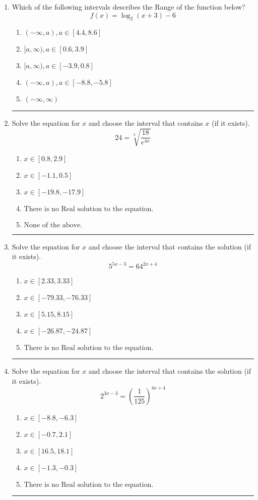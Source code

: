 \documentclass[14pt]{extbook}
\newcommand{\litem}[1]{\item#1\hspace*{-1cm}\rule{\textwidth}{0.4pt}}
\begin{document}
\begin{enumerate}
{\begin{enumerate}[label=\Alph*.]
\end{enumerate} }
\litem{
Which of the following intervals describes the Range of the function below?\[ f(x) = \log_2{(x+3)}-6 \]\begin{enumerate}[label=\Alph*.]
\item \( (-\infty, a), a \in [4.4, 8.6] \)
\item \( [a, \infty), a \in [0.6, 3.9] \)
\item \( [a, \infty), a \in [-3.9, 0.8] \)
\item \( (-\infty, a), a \in [-8.8, -5.8] \)
\item \( (-\infty, \infty) \)

\end{enumerate} }
\litem{
 Solve the equation for $x$ and choose the interval that contains $x$ (if it exists).\[  24 = \sqrt[3]{\frac{18}{e^{4x}}} \]\begin{enumerate}[label=\Alph*.]
\item \( x \in [0.8, 2.9] \)
\item \( x \in [-1.1, 0.5] \)
\item \( x \in [-19.8, -17.9] \)
\item \( \text{There is no Real solution to the equation.} \)
\item \( \text{None of the above.} \)

\end{enumerate} }
\litem{
Solve the equation for $x$ and choose the interval that contains the solution (if it exists).\[ 5^{5x-3} = 64^{2x+4} \]\begin{enumerate}[label=\Alph*.]
\item \( x \in [2.33, 3.33] \)
\item \( x \in [-79.33, -76.33] \)
\item \( x \in [5.15, 8.15] \)
\item \( x \in [-26.87, -24.87] \)
\item \( \text{There is no Real solution to the equation.} \)

\end{enumerate} }
\litem{
Solve the equation for $x$ and choose the interval that contains the solution (if it exists).\[ 2^{3x-3} = \left(\frac{1}{125}\right)^{4x+4} \]\begin{enumerate}[label=\Alph*.]
\item \( x \in [-8.8, -6.3] \)
\item \( x \in [-0.7, 2.1] \)
\item \( x \in [16.5, 18.1] \)
\item \( x \in [-1.3, -0.3] \)
\item \( \text{There is no Real solution to the equation.} \)


\end{enumerate}}
\end{enumerate}
\end{document}
